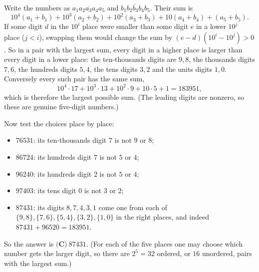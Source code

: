 Write the numbers as $\overline{a_1a_2a_3a_4a_5}$ and $\overline{b_1b_2b_3b_4b_5}$. Their sum is
\[10^4(a_1+b_1)+10^3(a_2+b_2)+10^2(a_3+b_3)+10(a_4+b_4)+(a_5+b_5).\]
If some digit $d$ in the $10^i$ place were smaller than some digit $e$ in a lower $10^j$ place ($j<i$), swapping them would change the sum by $(e-d)\left(10^i-10^j\right)>0$. So in a pair with the largest sum, every digit in a higher place is larger than every digit in a lower place: the ten-thousands digits are $9,8$, the thousands digits $7,6$, the hundreds digits $5,4$, the tens digits $3,2$ and the units digits $1,0$. Conversely every such pair has the same sum,
\[10^4\cdot17+10^3\cdot13+10^2\cdot9+10\cdot5+1=183951,\]
which is therefore the largest possible sum. (The leading digits are nonzero, so these are genuine five-digit numbers.)

Now test the choices place by place:
\begin{itemize}
\item $76531$: its ten-thousands digit $7$ is not $9$ or $8$;
\item $86724$: its hundreds digit $7$ is not $5$ or $4$;
\item $96240$: its hundreds digit $2$ is not $5$ or $4$;
\item $97403$: its tens digit $0$ is not $3$ or $2$;
\item $87431$: its digits $8,7,4,3,1$ come one from each of $\{9,8\},\{7,6\},\{5,4\},\{3,2\},\{1,0\}$ in the right places, and indeed $87431+96520=183951$.
\end{itemize}
So the answer is $\boxed{\textbf{(C)}\ 87431}$. (For each of the five places one may choose which number gets the larger digit, so there are $2^5=32$ ordered, or $16$ unordered, pairs with the largest sum.)

